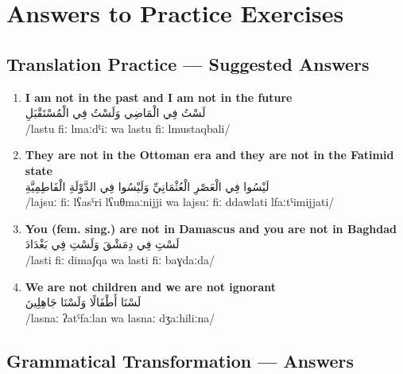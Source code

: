 \documentclass[letterpaper,12pt]{article}
\begin{document}
\section{Answers to Practice Exercises}

\subsection{Translation Practice — Suggested Answers}

\begin{enumerate}
\item \textbf{I am not in the past and I am not in the future}\\
\textarabic{لَسْتُ فِي الْمَاضِي وَلَسْتُ فِي الْمُسْتَقْبَلِ}\\
/lastu fiː lmaːdˤiː wa lastu fiː lmustaqbali/

\item \textbf{They are not in the Ottoman era and they are not in the Fatimid state}\\
\textarabic{لَيْسُوا فِي الْعَصْرِ الْعُثْمَانِيِّ وَلَيْسُوا فِي الدَّوْلَةِ الْفَاطِمِيَّةِ}\\
/lajsuː fiː lʕasˤri lʕuθmaːnijji wa lajsuː fiː ddawlati lfaːtˤimijjati/

\item \textbf{You (fem. sing.) are not in Damascus and you are not in Baghdad}\\
\textarabic{لَسْتِ فِي دِمَشْقَ وَلَسْتِ فِي بَغْدَادَ}\\
/lasti fiː dimaʃqa wa lasti fiː baɣdaːda/

\item \textbf{We are not children and we are not ignorant}\\
\textarabic{لَسْنَا أَطْفَالًا وَلَسْنَا جَاهِلِينَ}\\
/lasnaː ʔatˤfaːlan wa lasnaː dʒaːhiliːna/
\end{enumerate}

\subsection{Grammatical Transformation — Answers}
\end{document}
